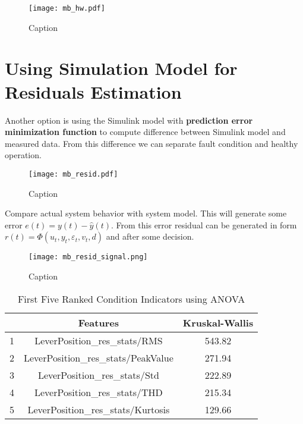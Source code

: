 \begin{figure}[h!]
    \centering
    \texttt{[image: mb\_hw.pdf]}
    \caption{Caption}
    \label{fig:}
\end{figure}


\section{Using Simulation Model for Residuals Estimation}\label{sec:residuals}

Another option is using the Simulink model with \textbf{prediction
error minimization function} to compute difference between Simulink model
and measured data. From this difference we can separate fault condition and
healthy operation. 

\begin{figure}[h!]
    \centering
    \texttt{[image: mb\_resid.pdf]}
    \caption{Caption}
    \label{fig:}
\end{figure}


Compare actual system behavior with system model. This will generate some
error $e(t) = y(t) - \hat{y}(t)$. From this error residual can be generated
in form $r(t)=\Phi(u_t,y_t, \varepsilon_t,v_t,d)$ and after some decision.

\begin{figure}[h!]
    \centering
    \texttt{[image: mb\_resid\_signal.png]}
    \caption{Caption}
    \label{fig:}
\end{figure}



\begin{table}[h!]
    \centering
    \begin{tabular}{|c|c|c|}
        \hline
          &        Features               & Kruskal-Wallis \\ \hline
        1 &   LeverPosition\_res\_stats/RMS	    & 543.82 \\ \hline  
        2 &   LeverPosition\_res\_stats/PeakValue	& 271.94 \\ \hline  
        3 &   LeverPosition\_res\_stats/Std	    & 222.89 \\ \hline  
        4 &   LeverPosition\_res\_stats/THD	    & 215.34 \\ \hline  
        5 &   LeverPosition\_res\_stats/Kurtosis	& 129.66 \\ \hline  
        \hline
    \end{tabular}
    \caption{First Five Ranked Condition Indicators using ANOVA}
    \label{tab:resid_sorted_ci}
\end{table}

